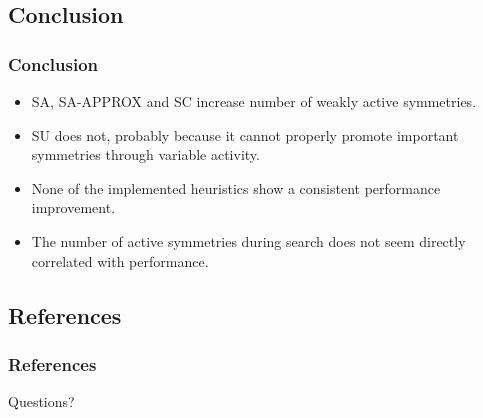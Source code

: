 \documentclass{beamer}
\begin{document}
	\subsection{Conclusion}
	\begin{frame}
		\frametitle{Conclusion}

		\begin{itemize}
			\item SA, SA-APPROX and SC increase number of weakly active symmetries.
			\item<+-> SU does not, probably because it cannot properly promote important 
			symmetries through variable activity.
			\item<+-> None of the implemented heuristics show a consistent performance 
			improvement.
			\item<+-> The number of active symmetries during search does not seem directly 
			correlated with performance.
		\end{itemize}
		
	\end{frame}

	\subsection{References}
	\begin{frame}[allowframebreaks]
		\frametitle{References}
		
		
	\end{frame}

	\begin{frame}
	\Huge{\centerline{Questions?}}
	\end{frame}
\end{document}
